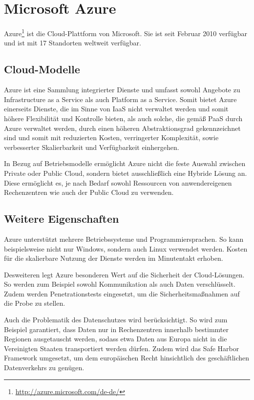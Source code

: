 \section{Microsoft Azure}
\label{sec_azure}

 Azure\footnote{\url{http://azure.microsoft.com/de-de/}} ist die Cloud-Plattform von Microsoft. 
Sie ist seit Februar 2010 verfügbar\cite{azureAvailable} und ist mit 17 Standorten weltweit verfügbar\cite{azureRegions}. 

\subsection{Cloud-Modelle}
\label{sec_azure_models}

Azure ist eine Sammlung integrierter Dienste und umfasst sowohl Angebote zu Infrastructure as a Service als auch Platform as a Service\cite{azureWhat}. 
Somit bietet Azure einerseits Dienste, die im Sinne von IaaS nicht verwaltet werden und somit höhere Flexibilität und Kontrolle bieten, als auch solche, die gemäß PaaS durch Azure verwaltet werden, durch einen höheren Abstraktionsgrad gekennzeichnet sind und somit mit reduzierten Kosten, verringerter Komplexität, sowie verbesserter Skalierbarkeit und Verfügbarkeit einhergehen\cite{azureVsAmazon}. 

In Bezug auf Betriebsmodelle ermöglicht Azure nicht die feste Auswahl zwischen Private oder Public Cloud, sondern bietet ausschließlich eine Hybride Lösung an\cite{azureVsAmazon}. 
Diese ermöglicht es, je nach Bedarf sowohl Ressourcen von anwendereigenen Rechenzentren wie auch der Public Cloud zu verwenden. 

\subsection{Weitere Eigenschaften}
\label{sec_azure_features}

Azure unterstützt mehrere Betriebssysteme und Programmiersprachen. 
So kann beispielsweise nicht nur Windows, sondern auch Linux verwendet werden. 
Kosten für die skalierbare Nutzung der Dienste werden im Minutentakt erhoben\cite{azureWhat}.

Desweiteren legt Azure besonderen Wert auf die Sicherheit der Cloud-Lösungen. 
So werden zum Beispiel sowohl Kommunikation als auch Daten verschlüsselt. 
Zudem werden Penetrationstests eingesetzt, um die Sicherheitsmaßnahmen auf die Probe zu stellen\cite{azureSecurity}.

Auch die Problematik des Datenschutzes wird berücksichtigt. 
So wird zum Beispiel garantiert, dass Daten nur in Rechenzentren innerhalb bestimmter Regionen ausgetauscht werden, sodass etwa Daten aus Europa nicht in die Vereinigten Staaten transportiert werden dürfen. 
Zudem wird das Safe Harbor Framework umgesetzt, um dem europäischen Recht hinsichtlich des geschäftlichen Datenverkehrs zu genügen\cite{azurePrivacy}.